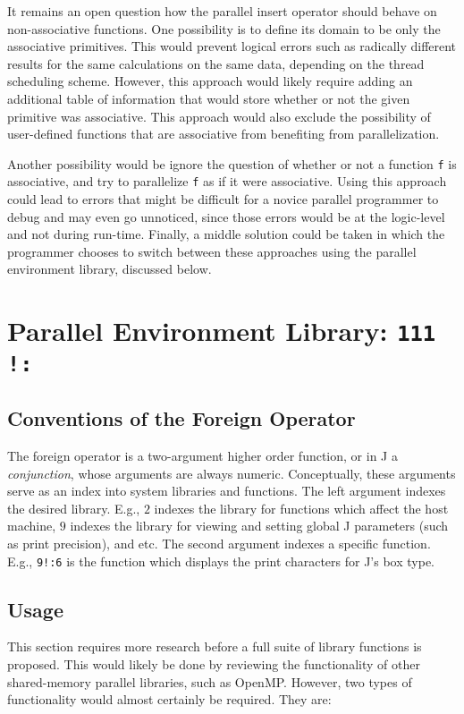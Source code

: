 It remains an open question how the parallel insert operator should behave on non-associative functions.
One possibility is to define its domain to be only the associative primitives. 
This would prevent logical errors such as radically different results for the same calculations on the same data, 
depending on the thread scheduling scheme. 
However, this approach would likely require adding an additional table of information 
that would store whether or not the given primitive was associative.
This approach would also exclude the possibility of 
user-defined functions that are associative from benefiting from parallelization. 

Another possibility would be ignore the question of whether or not a function \texttt{f} is associative, 
and try to parallelize \texttt{f} as if it were associative.
Using this approach could lead to errors that might be difficult for a novice parallel programmer to debug and may even go unnoticed, 
since those errors would be at the logic-level and not during run-time.
Finally, a middle solution could be taken in which the programmer chooses to switch between these approaches using the parallel environment library, 
discussed below.

\section{Parallel Environment Library: \texttt{111 !:}} 
\label{pfor}

\subsection{Conventions of the Foreign Operator}
The foreign operator is a two-argument higher order function, or in J a \textit{conjunction}, 
whose arguments are always numeric.
Conceptually, these arguments serve as an index into system libraries and functions.
The left argument indexes the desired library.
E.g., $2$ indexes the library for functions which affect the host machine, 
$9$ indexes the library for viewing and setting global J parameters (such as print precision), and etc.
The second argument indexes a specific function.
E.g., \texttt{9!:6}  is the function which displays the print characters for J's box type.

\subsection{Usage}
This section requires more research before a full suite of library functions is proposed.
This would likely be done by reviewing the functionality of other shared-memory parallel libraries, such as OpenMP\cite{openmp}. 
However, two types of functionality would almost certainly be required.
They are:

